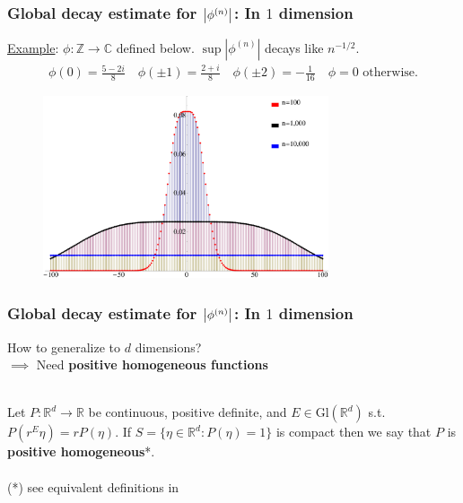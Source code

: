 \documentclass{beamer}
\theoremstyle{definition}
\begin{document}
\begin{frame}
\frametitle{Global decay estimate for $\abs{\phi^{(n)}}$: In $1$ dimension}

\underline{Example}: $\phi:\mathbb{Z} \to \mathbb{C}$ defined below. $\sup | \phi^{(n)} |$ decays like $n^{-1/2}$.
\begin{align*}
\phi(0) = \frac{5-2i}{8} \quad \phi(\pm 1) = \frac{2+i}{8} \quad \phi(\pm 2) = -\frac{1}{16} \quad \phi = 0 \text{ otherwise.}
\end{align*}

\begin{figure}
	\vspace{-10pt}
	\centering
	\includegraphics[width=0.75\textwidth]{ex1abs.eps}
\end{figure}

\end{frame}




\begin{frame}
\frametitle{Global decay estimate for $\abs{\phi^{(n)}}$: In $1$ dimension}

How to generalize to $d$ dimensions?\\ $\implies$ Need \textbf{positive homogeneous functions}\\
$\,$\\
\begin{definition}
	Let $P:\mathbb{R}^d\to\mathbb{R}$ be continuous, positive definite, and $E\in \text{Gl}(\mathbb{R}^d)$ s.t. $P(r^E \eta) = rP(\eta)$. If $S = \{ \eta \in \mathbb{R}^d : P(\eta) = 1 \}$ is compact then we say that $P$ is\textbf{ positive homogeneous}*.\\
	$\,$\\
	
	\scriptsize{(*) see equivalent definitions in \cite{bui2021generalized}}
\end{definition}


\end{frame}
\end{document}
